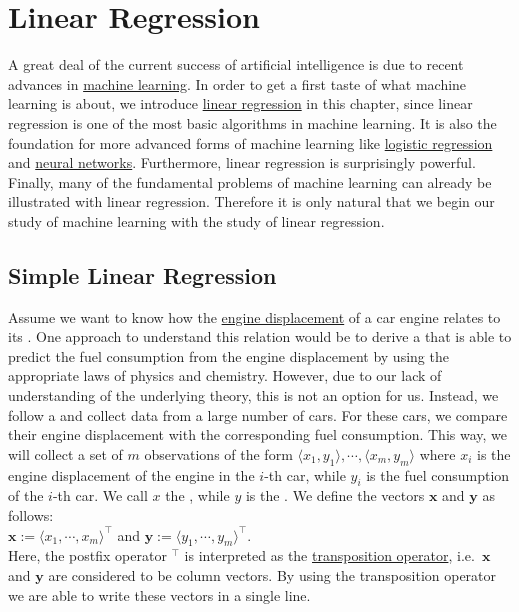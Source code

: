 \chapter{Linear Regression}
A great deal of the current success of artificial intelligence is due to recent advances in
\href{https://en.wikipedia.org/wiki/Machine_learning}{machine learning}.  
In order to get a first taste of what machine learning is about, we introduce 
\href{https://en.wikipedia.org/wiki/Linear_regression}{linear regression} 
in this chapter, since linear regression
is one of the most basic algorithms in machine learning.  It is also the foundation for more advanced
forms of machine learning like \href{https://en.wikipedia.org/wiki/Logistic_regression}{logistic regression} and 
\href{https://en.wikipedia.org/wiki/Artificial_neural_network}{neural networks}.
Furthermore, linear regression is surprisingly powerful.  Finally, many of the fundamental problems of machine
learning can already be illustrated with linear regression.  Therefore it is only natural that we begin our
study of machine learning with the study of linear regression.

\section{Simple Linear Regression}
Assume we want to know how the \href{https://en.wikipedia.org/wiki/Engine_displacement}{engine displacement} of
a car engine relates to its .  One approach to understand this relation would be to derive a
 that is able to predict the fuel consumption from the engine displacement by using the
appropriate laws of physics and chemistry.  However, due to our lack of understanding of the underlying theory,
this is not an option for us.  Instead, we follow a  and collect data from a large number
of cars.  For these cars, we compare their engine displacement with the corresponding fuel consumption.  This
way, we will collect a set of $m$ observations of the form $\langle x_1, y_1\rangle, \cdots, \langle x_m, y_m\rangle$ 
where $x_i$ is the engine displacement of the engine in the $i$-th car, while $y_i$ is the fuel consumption of the
$i$-th car.  We call $x$ the ,  while $y$ is the 
.   We define the vectors $\mathbf{x}$ and $\mathbf{y}$ as follows:
\\[0.2cm]
\hspace*{1.3cm}
$\mathbf{x} := \langle x_1, \cdots, x_m \rangle^\top$ \quad and \quad
$\mathbf{y} := \langle y_1, \cdots, y_m \rangle^\top$.
\\[0.2cm]
Here, the postfix operator $^\top$ is interpreted as the
\href{https://en.wikipedia.org/wiki/Transpose}{transposition operator}, 
i.e.~$\mathbf{x}$ and $\mathbf{y}$ are considered to be column vectors.  By using the transposition operator we are
able to write these vectors in a single line.

